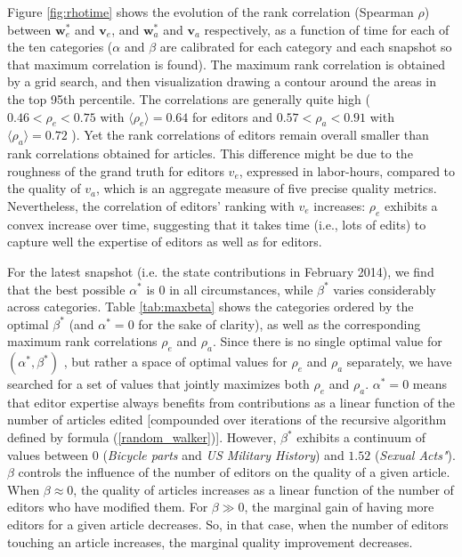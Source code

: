
Figure \ref{fig:rhotime} shows the evolution of the rank correlation (Spearman $\rho$) between $\mathbf{w}^*_e$ and $\mathbf{v}_e$, and $\mathbf{w}^*_a$ and $\mathbf{v}_a$ respectively, as a function of time for each of the ten categories ($\alpha$ and $\beta$ are calibrated for each category and each snapshot so that maximum correlation is found). The maximum rank correlation is obtained by a grid search, and then visualization drawing a contour around the areas in the top 95th percentile.
The correlations are generally quite high ( $ 0.46 < \rho_e < 0.75$ with $\langle \rho_e\rangle = 0.64$ for editors and $0.57 < \rho_a < 0.91$ with $\langle \rho_a\rangle = 0.72$ ). Yet the rank correlations of editors remain overall smaller than rank correlations obtained for articles. This difference might be due to the roughness of the grand truth for editors $v_e$, expressed in labor-hours, compared to the quality of $v_a$, which is an aggregate measure of five precise quality metrics. Nevertheless, the correlation of editors' ranking with $v_e$ increases: $\rho_e$ exhibits a convex increase over time, suggesting that it takes time (i.e., lots of edits) to capture well the expertise of editors as well as for editors. 

For the latest snapshot (i.e. the state contributions in February 2014), we find that the best possible $\alpha^*$ is $0$ in all circumstances, while $\beta^*$ varies considerably across categories. Table \ref{tab:maxbeta} shows the categories ordered by the optimal $\beta^*$ (and $\alpha^*=0$ for the sake of clarity), as well as the corresponding maximum rank correlations $\rho_e$ and $\rho_a$. Since there is no single optimal value for $(\alpha^*,\beta^*)$ , but rather a space of optimal values for  $\rho_e$ and $\rho_a$ separately, we have searched for a set of values that jointly maximizes both $\rho_e$ and $\rho_a$. $\alpha^* = 0$ means that editor expertise always benefits from contributions as a linear function of the number of articles edited [compounded over iterations of the recursive algorithm defined by formula (\ref{random_walker})].  However, $\beta^*$ exhibits a continuum of values between $0$ ({\it Bicycle parts} and {\it US Military History}) and $1.52$ ({\it Sexual Acts"}). $\beta$ controls the influence of the number of editors on the quality of a given article. When $\beta \approx 0$, the quality of articles increases as a linear function of the number of editors who have modified them. For $\beta \gg 0$, the marginal gain of having more editors for a given article decreases. So, in that case, when the number of editors touching an article increases, the marginal quality improvement decreases.

